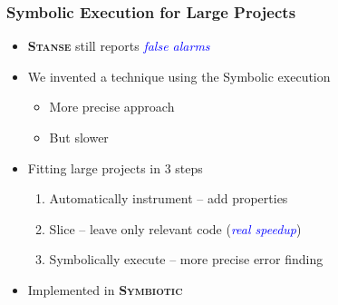 \documentclass[xcolor=dvipsnames]{beamer}
\let\Oldemph\emph
\renewcommand{\emph}[1]{\textcolor{blue}{\Oldemph{#1}}}
\newcommand{\stan}{\textbf{\textsc{Stanse}}\xspace}
\newcommand{\symb}{\textbf{\textsc{Symbiotic}}\xspace}
\begin{document}
\begin{frame}[fragile]
  \frametitle{Symbolic Execution for Large Projects}

  \begin{itemize}
    \item<1-> \stan still reports \emph{false alarms}

    \item<2-> We invented a technique using the Symbolic execution
    \begin{itemize}
      \item More precise approach
      \item But slower
    \end{itemize}

    \item<3-> Fitting large projects in 3 steps
    \begin{enumerate}
      \item<4-> Automatically instrument -- add properties
      \item<5-> Slice -- leave only relevant code (\emph{real speedup})
      \item<6-> Symbolically execute -- more precise error finding
    \end{enumerate}

    \item<7-> Implemented in \symb
  \end{itemize}

  \begin{center}
  \begin{semiverbatim}
       
     
  \end{semiverbatim}
  \end{center}

\end{frame}
\end{document}

